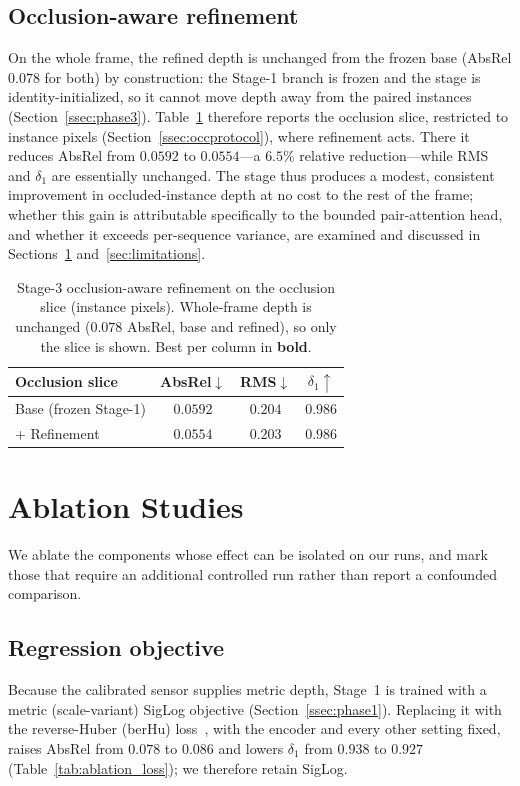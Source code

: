 \documentclass[sigconf, review=true]{acmart}
\begin{document}
\subsection{Occlusion-aware refinement}
On the whole frame, the refined depth is unchanged from the frozen base
(AbsRel $0.078$ for both) by construction: the Stage-1 branch is frozen and the
stage is identity-initialized, so it cannot move depth away from the paired
instances (Section~\ref{ssec:phase3}). Table~\ref{tab:refine} therefore reports
the occlusion slice, restricted to instance pixels
(Section~\ref{ssec:occprotocol}), where refinement acts. There it reduces AbsRel
from $0.0592$ to $0.0554$---a $6.5\%$ relative reduction---while RMS and
$\delta_1$ are essentially unchanged. The stage thus produces a modest,
consistent improvement in occluded-instance depth at no cost to the rest of the
frame; whether this gain is attributable specifically to the bounded
pair-attention head, and whether it exceeds per-sequence variance, are examined
and discussed in Sections~\ref{sec:ablation} and~\ref{sec:limitations}.

\begin{table}[t]
\centering
\caption{Stage-3 occlusion-aware refinement on the occlusion slice
(instance pixels). Whole-frame depth is unchanged ($0.078$ AbsRel, base and
refined), so only the slice is shown. Best per column in \textbf{bold}.}
\label{tab:refine}
\begin{tabular}{lccc}
\toprule
Occlusion slice & AbsRel$\downarrow$ & RMS$\downarrow$ & $\delta_1\uparrow$ \\
\midrule
Base (frozen Stage-1) & $0.0592$ & $0.204$ & $0.986$ \\
\;\;+ Refinement       & $\mathbf{0.0554}$ & $\mathbf{0.203}$ & $\mathbf{0.986}$ \\
\bottomrule
\end{tabular}
\end{table}

\section{Ablation Studies}
\label{sec:ablation}
We ablate the components whose effect can be isolated on our runs, and mark
those that require an additional controlled run rather than report a confounded
comparison.

\subsection{Regression objective}
Because the calibrated sensor supplies metric depth, Stage~1 is trained with a
metric (scale-variant) SigLog objective (Section~\ref{ssec:phase1}). Replacing
it with the reverse-Huber (berHu) loss~\cite{laina2016berhu}, with the encoder
and every other setting fixed, raises AbsRel from $0.078$ to $0.086$ and lowers
$\delta_1$ from $0.938$ to $0.927$ (Table~\ref{tab:ablation_loss}); we therefore
retain SigLog.
\end{document}
